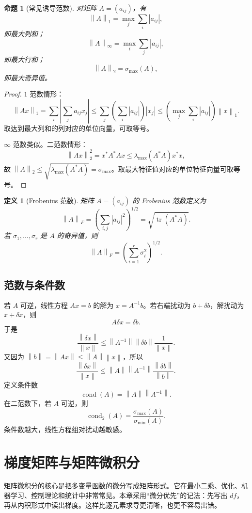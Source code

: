 \documentclass[UTF8,openany,zihao=-4]{ctexbook}
\theoremstyle{cnplain}
\newtheorem{definition}{定义}[chapter]
\newtheorem{proposition}{命题}[chapter]
\newcommand{\tr}{\operatorname{tr}}
\newcommand{\cond}{\operatorname{cond}}
\newcommand{\norm}[1]{\left\lVert #1\right\rVert}
\newcommand{\abs}[1]{\left\lvert #1\right\rvert}
\begin{document}
\begin{proposition}[常见诱导范数]
对矩阵 $A=(a_{ij})$，有
\[
\norm{A}_1=\max_j\sum_i\abs{a_{ij}},
\]
即最大列和；
\[
\norm{A}_\infty=\max_i\sum_j\abs{a_{ij}},
\]
即最大行和；
\[
\norm{A}_2=\sigma_{\max}(A),
\]
即最大奇异值。
\end{proposition}

\begin{proof}
$1$ 范数情形：
\[
\norm{Ax}_1=\sum_i\abs{\sum_j a_{ij}x_j}
\le\sum_j\left(\sum_i\abs{a_{ij}}\right)\abs{x_j}
\le\left(\max_j\sum_i\abs{a_{ij}}\right)\norm{x}_1.
\]
取达到最大列和的列对应的单位向量，可取等号。

$\infty$ 范数类似。二范数情形：
\[
\norm{Ax}_2^2=x^*A^*Ax\le\lambda_{\max}(A^*A)x^*x,
\]
故 $\norm{A}_2\le\sqrt{\lambda_{\max}(A^*A)}=\sigma_{\max}$。取最大特征值对应的单位特征向量可取等号。
\end{proof}

\begin{definition}[Frobenius 范数]
矩阵 $A=(a_{ij})$ 的 Frobenius 范数定义为
\[
\norm{A}_F=\left(\sum_{i,j}\abs{a_{ij}}^2\right)^{1/2}
=\sqrt{\tr(A^*A)}.
\]
若 $\sigma_1,
\ldots,\sigma_r$ 是 $A$ 的奇异值，则
\[
\norm{A}_F=\left(\sum_{i=1}^r\sigma_i^2\right)^{1/2}.
\]
\end{definition}

\section{范数与条件数}

若 $A$ 可逆，线性方程 $Ax=b$ 的解为 $x=A^{-1}b$。若右端扰动为 $b+\delta b$，解扰动为 $x+\delta x$，则
\[
A\delta x=\delta b.
\]
于是
\[
\frac{\norm{\delta x}}{\norm{x}}
\le
\norm{A^{-1}}\norm{\delta b}\frac{1}{\norm{x}}.
\]
又因为 $\norm{b}=\norm{Ax}\le\norm{A}\norm{x}$，所以
\[
\frac{\norm{\delta x}}{\norm{x}}
\le
\norm{A}\norm{A^{-1}}
\frac{\norm{\delta b}}{\norm{b}}.
\]
定义条件数
\[
\cond(A)=\norm{A}\norm{A^{-1}}.
\]
在二范数下，若 $A$ 可逆，则
\[
\cond_2(A)=\frac{\sigma_{\max}(A)}{\sigma_{\min}(A)}.
\]
条件数越大，线性方程组对扰动越敏感。

\chapter{梯度矩阵与矩阵微积分}

矩阵微积分的核心是把多变量函数的微分写成矩阵形式。它在最小二乘、优化、机器学习、控制理论和统计中非常常见。本章采用“微分优先”的记法：先写出 $df$，再从内积形式中读出梯度。这样比逐元素求导更清晰，也更不容易出错。
\end{document}
